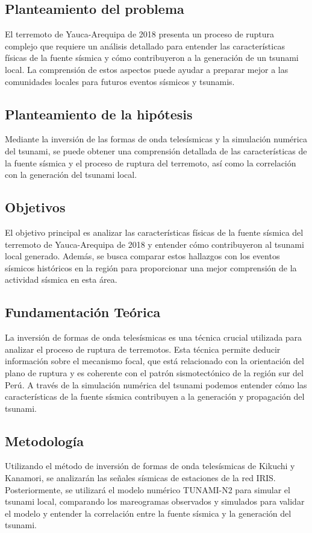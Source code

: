 \documentclass[spanish,a4paper,11pt]{article}
\begin{document}
\subsection*{Planteamiento del problema}
\noindent El terremoto de Yauca-Arequipa de 2018 presenta un proceso de ruptura complejo que requiere un análisis detallado para entender las características físicas de la fuente sísmica y cómo contribuyeron a la generación de un tsunami local. La comprensión de estos aspectos puede ayudar a preparar mejor a las comunidades locales para futuros eventos sísmicos y tsunamis.

\subsection*{Planteamiento de la hipótesis}
\noindent Mediante la inversión de las formas de onda telesísmicas y la simulación numérica del tsunami, se puede obtener una comprensión detallada de las características de la fuente sísmica y el proceso de ruptura del terremoto, así como la correlación con la generación del tsunami local.

\subsection*{Objetivos} 
\noindent El objetivo principal es analizar las características físicas de la fuente sísmica del terremoto de Yauca-Arequipa de 2018 y entender cómo contribuyeron al tsunami local generado. Además, se busca comparar estos hallazgos con los eventos sísmicos históricos en la región para proporcionar una mejor comprensión de la actividad sísmica en esta área.

\subsection{Fundamentación Teórica} 
\noindent La inversión de formas de onda telesísmicas es una técnica crucial utilizada para analizar el proceso de ruptura de terremotos. Esta técnica permite deducir información sobre el mecanismo focal, que está relacionado con la orientación del plano de ruptura y es coherente con el patrón sismotectónico de la región sur del Perú. A través de la simulación numérica del tsunami podemos entender cómo las características de la fuente sísmica contribuyen a la generación y propagación del tsunami.

\subsection{Metodología} 
\noindent Utilizando el método de inversión de formas de onda telesísmicas de Kikuchi y Kanamori, se analizarán las señales sísmicas de estaciones de la red IRIS. Posteriormente, se utilizará el modelo numérico TUNAMI-N2 para simular el tsunami local, comparando los mareogramas observados y simulados para validar el modelo y entender la correlación entre la fuente sísmica y la generación del tsunami.
\end{document}
